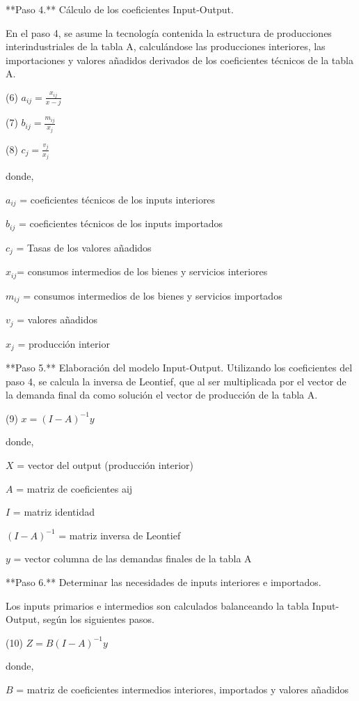 \documentclass{article}
\begin{document}
**Paso 4.** Cálculo de los coeficientes Input-Output.

En el paso 4, se asume la tecnología contenida la estructura de producciones interindustriales de la tabla A, calculándose las producciones interiores, las importaciones y valores añadidos derivados de los coeficientes técnicos de la tabla A.

(6) $a_{ij} = \frac {x_{ij}}{x-{j}}$

(7) $b_{ij} = \frac {m_{ij}}{x_{j}}$

(8) $c_{j} = \frac {v_{j}}{x_{j}}$

donde,

$a_{ij}$ = coeficientes técnicos de los inputs interiores

$b_{ij}$ = coeficientes técnicos de los inputs importados

$c_{j}$ = Tasas de los valores añadidos

$x_{ij}$= consumos intermedios de los bienes y servicios interiores

$m_{ij}$ = consumos intermedios de los bienes y servicios importados

$v_{j}$ = valores añadidos

$x_{j}$ = producción interior

**Paso 5.** Elaboración del modelo Input-Output.
Utilizando los coeficientes del paso 4, se calcula la inversa de Leontief, que al ser multiplicada por el vector de la demanda final da como solución el vector de producción de la tabla A.

(9) $x = (I-A)^{-1}y$

donde,

$X$ = vector del output (producción interior)

$A$ = matriz de coeficientes aij

$I$ = matriz identidad

$(I-A)^{-1}$ = matriz inversa de Leontief

$y$ = vector columna de las demandas finales de la tabla A

**Paso 6.** Determinar las necesidades de inputs interiores e importados.

Los inputs primarios e intermedios son calculados  balanceando la tabla Input-Output, según los siguientes pasos.

(10) $Z = B(I-A)^{-1}y$

donde,

$B$ = matriz de coeficientes intermedios interiores, importados y valores añadidos
\end{document}
